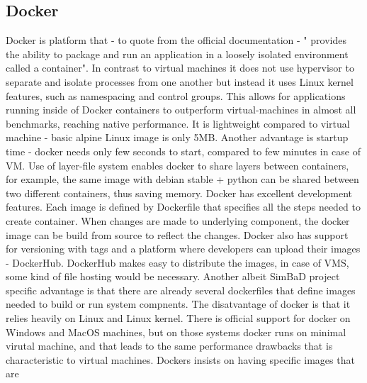 \subsection{Docker}
Docker is platform that - to quote from the official documentation - " provides the ability to package and run an application in a loosely isolated environment called a container". In contrast to virtual machines it does not use hypervisor to separate and isolate processes from one another but instead it uses Linux kernel features, such as namespacing and control groups. This allows for applications running inside of Docker containers to outperform virtual-machines in almost all benchmarks, reaching native performance.  It is lightweight compared to virtual machine - basic alpine Linux image is only 5MB. Another advantage is startup time - docker needs only few seconds to start, compared to few minutes in case of VM. Use of layer-file system enables docker to share layers between containers, for example, the same image with debian stable + python can be shared between two different containers, thus saving memory. 
Docker has excellent development features. Each image is defined by Dockerfile that specifies all the steps needed to create container. When changes are made to underlying component, the docker image can be build from source to reflect the changes. Docker also has support for versioning with tags and a platform where developers can upload their images - DockerHub. DockerHub makes easy to distribute the images, in case of VMS, some kind of file hosting would be necessary. Another albeit  SimBaD project specific advantage is that there are already several dockerfiles that define images needed to build or run system compnents.
The disatvantage of docker is that it relies heavily on Linux and Linux kernel. There is official support for docker on Windows and MacOS machines, but on those systems docker runs on minimal virutal machine, and that leads to the same performance drawbacks that is characteristic to virtual machines. Dockers insists on having specific images that are
